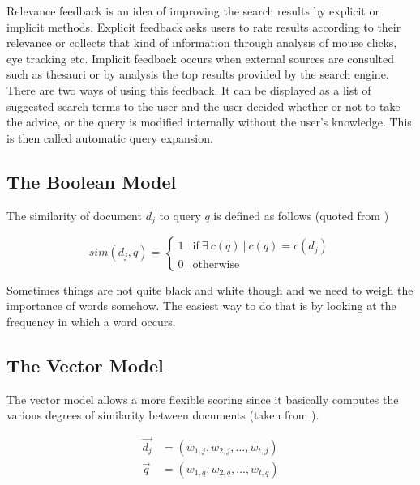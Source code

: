 Relevance feedback is an idea of improving the search results by explicit or implicit methods. Explicit feedback asks users to rate results according to their relevance or collects that kind of information through analysis of mouse clicks, eye tracking etc. Implicit feedback occurs when external sources are consulted such as thesauri or by analysis the top results provided by the search engine. There are two ways of using this feedback. It can be displayed as a list of suggested search terms to the user and the user decided whether or not to take the advice, or the query is modified internally without the user's knowledge. This is then called automatic query expansion.


\subsection{The Boolean Model}

The similarity of document $d_j$ to query $q$ is defined as follows (quoted from \citep[p.65]{Baeza-Yates2011})

\begin{equation}
  sim(d_j,q) =
  \begin{cases}
  1 & \text{if} \ \exists \ c(q) \ | \ c(q) = c(d_j)\\
  0 & \text{otherwise}
  \end{cases}
  \label{eq:sim}
\end{equation}

Sometimes things are not quite black and white though and we need to weigh the importance of words somehow. The easiest way to do that is by looking at the frequency in which a word occurs.


\subsection{The Vector Model}

The vector model allows a more flexible scoring since it basically computes the various degrees of similarity between documents (taken from \citep[p.78]{Baeza-Yates2011}).

\begin{equation}
  \begin{split}
  \vec{d_j} &= (w_{1,j}, w_{2,j}, \ldots, w_{t,j})\\
  \vec{q} &= (w_{1,q}, w_{2,q}, \ldots, w_{t,q})
  \end{split}
  \label{eq:vector}
\end{equation}

